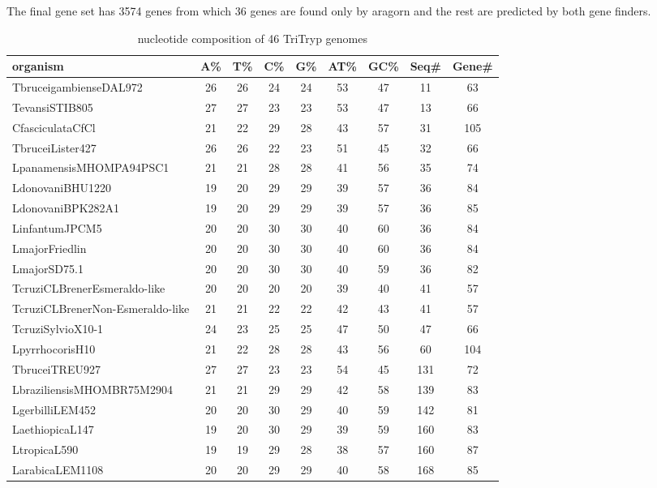 \documentclass[table,
12pt, %
a4paper, %
oneside, %
headinclude,footinclude, %
BCOR5mm, %
]{scrartcl}
\begin{document}
The final gene set has 3574 genes from which 36 genes are found only by aragorn and the rest are predicted by both gene finders. %

 



\begin{table}[htbp]
\caption{nucleotide composition of 46 TriTryp genomes}
\begin{adjustbox}{center}
\begin{tabular}{|l|cccccccc|}\hline\hline
organism&A\%&T\%&C\%&G\%&AT\%&GC\%&Seq\#&Gene\#\\
\hline
TbruceigambienseDAL972&26&26&24&24&53&47&11&63\\
TevansiSTIB805&27&27&23&23&53&47&13&66\\
CfasciculataCfCl&21&22&29&28&43&57&31&105\\
TbruceiLister427&26&26&22&23&51&45&32&66\\
LpanamensisMHOMPA94PSC1&21&21&28&28&41&56&35&74\\
LdonovaniBHU1220&19&20&29&29&39&57&36&84\\
LdonovaniBPK282A1&19&20&29&29&39&57&36&85\\
LinfantumJPCM5&20&20&30&30&40&60&36&84\\
LmajorFriedlin&20&20&30&30&40&60&36&84\\
LmajorSD75.1&20&20&30&30&40&59&36&82\\
TcruziCLBrenerEsmeraldo-like&20&20&20&20&39&40&41&57\\
TcruziCLBrenerNon-Esmeraldo-like&21&21&22&22&42&43&41&57\\
TcruziSylvioX10-1&24&23&25&25&47&50&47&66\\
LpyrrhocorisH10&21&22&28&28&43&56&60&104\\
TbruceiTREU927&27&27&23&23&54&45&131&72\\
LbraziliensisMHOMBR75M2904&21&21&29&29&42&58&139&83\\
LgerbilliLEM452&20&20&30&29&40&59&142&81\\
LaethiopicaL147&19&20&30&29&39&59&160&83\\
LtropicaL590&19&19&29&28&38&57&160&87\\
LarabicaLEM1108&20&20&29&29&40&58&168&85\\

\end{tabular}
\end{adjustbox}
\end{table}
\end{document}
